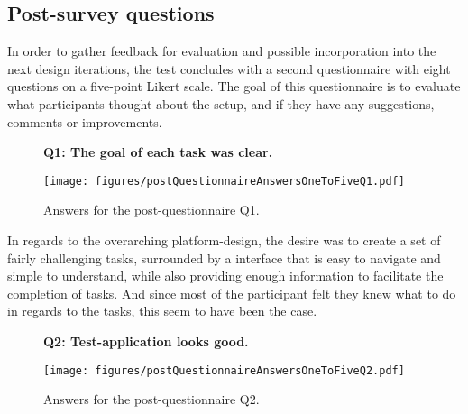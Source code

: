  \subsection{Post-survey questions}

    In order to gather feedback for evaluation and possible incorporation
    into the next design iterations, the test concludes with a second
    questionnaire with eight questions on a five-point Likert scale. The goal
    of this questionnaire is to evaluate what participants thought about the setup,
    and if they have any suggestions, comments or improvements.

    \begin{figure}[h!]
      \textbf{Q1: The goal of each task was clear.}
      \begin{center}
        \texttt{[image: figures/postQuestionnaireAnswersOneToFiveQ1.pdf]}
        \caption{Answers for the post-questionnaire Q1.}
      \end{center}
    \end{figure}

    In regards to the overarching platform-design, the desire was to create
    a set of fairly challenging tasks, surrounded by a interface that is easy to
    navigate and simple to understand, while also providing enough information
    to facilitate the completion of tasks. And since most of the participant felt
    they knew what to do in regards to the tasks, this seem to have been the
    case.



    \begin{figure}[h!]
      \textbf{Q2: Test-application looks good.}
      \begin{center}
        \texttt{[image: figures/postQuestionnaireAnswersOneToFiveQ2.pdf]}
        \caption{Answers for the post-questionnaire Q2.}
      \end{center}
    \end{figure}

